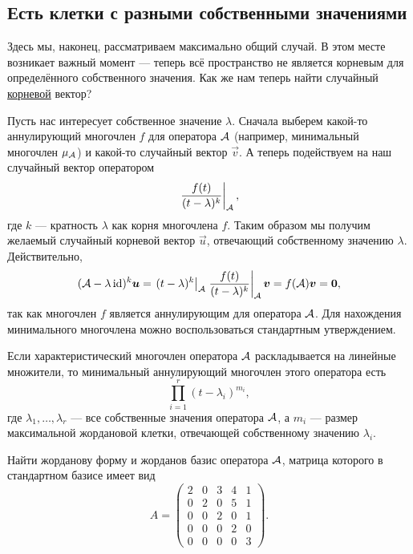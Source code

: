 \subsection{Есть клетки с разными собственными значениями}

Здесь мы, наконец, рассматриваем максимально общий случай. В этом месте возникает важный момент --- теперь всё пространство не является корневым для определённого собственного значения. Как же нам теперь найти случайный \underline{корневой} вектор?

Пусть нас интересует собственное значение $\lambda$. Сначала выберем какой-то аннулирующий многочлен $f$ для оператора $\mathcal{A}$ (например, минимальный многочлен $\mu_{\mathcal{A}}$) и какой-то случайный вектор $\vec{v}$. А теперь подействуем на наш случайный вектор оператором
\[
	\left.\frac{f(t)}{(t - \lambda)^k}\right|_{\mathcal{A}},
\]
где $k$ --- кратность $\lambda$ как корня многочлена $f$. Таким образом мы получим желаемый случайный корневой вектор $\vec{u}$, отвечающий собственному значению $\lambda$. Действительно,
\[
	(\mathcal{A} - \lambda\operatorname{id})^k\boldsymbol{u} = \left.(t - \lambda)^k\right|_{\mathcal{A}}\left.\frac{f(t)}{(t - \lambda)^k}\right|_{\mathcal{A}}\boldsymbol{v} = f(\mathcal{A})\boldsymbol{v} = \boldsymbol{0},
\]
так как многочлен $f$ является аннулирующим для оператора $\mathcal{A}$. Для нахождения минимального многочлена можно воспользоваться стандартным утверждением.

\begin{proposition}
	Если характеристический многочлен оператора $\mathcal{A}$ раскладывается на линейные множители, то минимальный аннулирующий многочлен этого оператора есть
	\[
		\prod_{i = 1}^r(t - \lambda_i)^{m_i},
	\]
	где $\lambda_1, \ldots, \lambda_r$ --- все собственные значения оператора $\mathcal{A}$, а $m_i$ --- размер максимальной жордановой клетки, отвечающей собственному значению $\lambda_i$.
\end{proposition}

\begin{problem}
	Найти жорданову форму и жорданов базис оператора $\mathcal{A}$, матрица которого в стандартном базисе имеет вид
	\[
		A =
		\begin{pmatrix}
			2 & 0 & 3 & 4 & 1\\
			0 & 2 & 0 & 5 & 1\\
			0 & 0 & 2 & 0 & 1\\
			0 & 0 & 0 & 2 & 0\\
			0 & 0 & 0 & 0 & 3
		\end{pmatrix}.
	\]
\end{problem}

